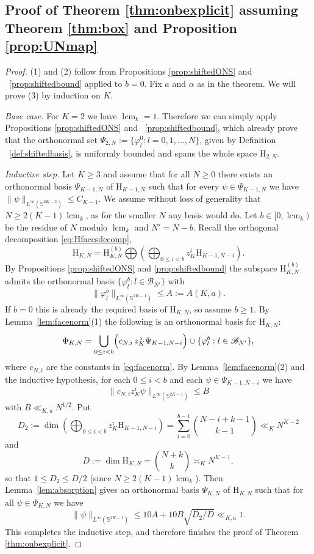 \documentclass[a4paper,reqno,12pt]{amsart}
\theoremstyle{plain}
\theoremstyle{plain}
\theoremstyle{remark}
\theoremstyle{plain}
\newcommand{\B}{\mathscr{B}}
\renewcommand{\H}{\mathrm{H}}
\newcommand{\p}{\varphi}
\newcommand{\Sphere}{\mathbb{S}}
\newcommand{\lcmk}{\operatorname{lcm}_k}
\theoremstyle{plain}
\theoremstyle{plain}
\begin{document}
{\subsection{Proof of Theorem \ref{thm:onbexplicit} assuming Theorem \ref{thm:box} and Proposition \ref{prop:UNmap}}
\begin{proof}
(1) and (2) follow from Propositions \ref{prop:shiftedONS} and ~\ref{prop:shiftedbound} applied to $b=0$. 
Fix $a$ and $\alpha$ as in the theorem. We will prove (3) by induction on $K$.  

\emph{Base case.} For $K=2$ we have $\lcmk = 1$. Therefore we can simply apply Propositions \ref{prop:shiftedONS} and ~\ref{prop:shiftedbound}, which already prove that the orthonormal set $\Psi_{2,N}:=\{\p^0_{l}: l=0,1,{\ldots}, N\}$, given by Definition ~\ref{def:shiftedbasis}, is uniformly bounded and spans the whole space $\H_{2,N}$.

\emph{Inductive step.} Let ${K\ge3}$ and assume that for all $N \geq 0$
there exists an orthonormal basis $\Psi_{K - 1, N}$ of $\H_{K-1,N}$
such that for every $\psi \in \Psi_{K - 1, N}$ we have $\| \psi \|_{L^{\infty}(\Sphere^{2K - 3})} \leq C_{K - 1}$.
We assume without loss of generality that $N \geq 2 (K - 1) \lcmk$, as for the smaller $N$ any basis would do.
Let $b \in [0, \lcmk)$ be the residue of $N$ modulo $\lcmk$ and $N'=N-b$.
Recall the orthogonal decomposition  \eqref{eq:Hfacesdecomp},
$$\H_{K,N} =  \H_{K,N}^{(b)} \bigoplus \left(\bigoplus_{0\leq i<b} z_K^i \H_{K-1,N-i} \right).$$
By Propositions \ref{prop:shiftedONS} and \ref{prop:shiftedbound} the subspace $\H_{K,N}^{(b)}$ admits the orthonormal basis $\{\p^b_{l}:l\in\B_{N'}\}$ with
$$
\| \p^b_{l} \|_{L^{\infty}(\Sphere^{2K - 1})} \leq A := A(K,a).
$$
If $b=0$ this is already the required basis of $\H_{K,N}$, so assume $b\ge1$.
By Lemma~\ref{lem:facenorm}(1) the following is an orthonormal basis for $\H_{K,N}$:
\[
\Phi_{K,N}= \bigcup_{0\leq i  < b} \Bigl(c_{N,i}\,z_K^{\,i} \Psi_{K-1,N-i}\Bigr) \cup \{\p^b_{l} : l\in \B_{N'}\},
\]
where $c_{N,i}$ are the constants in \eqref{eq:facenorm}.
By Lemma~\ref{lem:facenorm}(2) and the inductive hypothesis, for each $0\le i<b$ and each $\psi \in \Psi_{K - 1, N - i}$ we have
$$
\| c_{N,i} z_K^i \psi \|_{L^{\infty}(\Sphere^{2K-1})} \leq B
$$
with $B \ll_{K,a} N^{1/2}$.
Put
$$
D_2:=\dim \left(\bigoplus_{0\leq i<b} z_K^i \H_{K-1,N-i}\right) =\sum_{i=0}^{b-1}\binom{N-i+k-1}{k-1} \ll_K N^{K - 2}
$$
and
$$
D:=\dim \H_{K,N}=\binom{N+k}{k} \asymp_K N^{K - 1},
$$
so that $1\le D_2\le D/2$ (since $N \geq 2 (K - 1) \lcmk$).
Then Lemma~\ref{lem:absorption} gives an orthonormal basis $\Psi_{K,N}$ of $\H_{K,N}$ such that
for all $\psi \in \Psi_{K,N}$ we have
\[
 \|\psi\|_{L^\infty(\Sphere^{2K-1})} \leq 10A+10B\sqrt{D_2/D} \ll_{K,a}  1.
\] 
This completes the inductive step, and therefore finishes the proof of Theorem \ref{thm:onbexplicit}.  
\end{proof}

}
\end{document}
